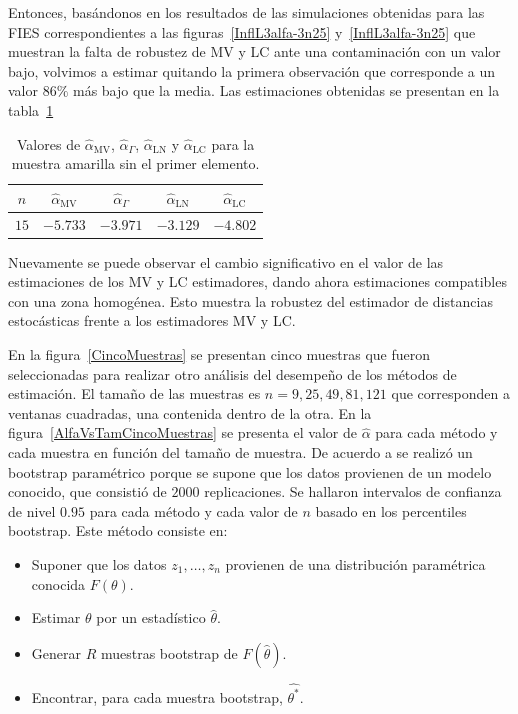 Entonces, basándonos en los resultados de las simulaciones obtenidas para las FIES correspondientes a las figuras~\ref{InflL3alfa-3n25} y~\ref{InflL3alfa-3n25} que muestran la falta de robustez de MV y LC ante una contaminación con un valor bajo, volvimos a estimar quitando la primera observación que corresponde a un valor $86\%$ más bajo que la media. Las estimaciones obtenidas se presentan en la tabla~\ref{SinPrimero}
\begin{table}[htb]
	\centering
	\caption{\label{SinPrimero} Valores de $\widehat{\alpha}_{\text{MV}}$, $\widehat{\alpha}_{\Gamma}$, $\widehat{\alpha}_{\text{LN}}$ y $\widehat{\alpha}_{\text{LC}}$ para la muestra amarilla sin el primer elemento.}
	\begin{tabular}{c*4{c}}
		\toprule
		$n$    &  $\widehat{\alpha}_{\text{MV}}$    &  $\widehat{\alpha}_{\Gamma}$  &  $\widehat{\alpha}_{\text{LN}}$ &  $\widehat{\alpha}_{\text{LC}}$\\
		\midrule
		$15$  & $-5.733$   & $-3.971$    & $-3.129$    & $-4.802$\\
		\bottomrule
	\end{tabular}
\end{table}

Nuevamente se puede observar el cambio significativo en el valor de las estimaciones de los MV y LC estimadores, dando ahora estimaciones compatibles con una zona homogénea. Esto muestra la robustez del estimador de distancias estocásticas frente a los estimadores MV y LC.

En la figura~\ref{CincoMuestras} se presentan cinco muestras que fueron seleccionadas para realizar otro análisis del desempeño de los métodos de estimación. El tamaño de las muestras es $n=9,25,49,81,121$ que corresponden a ventanas cuadradas, una contenida dentro de la otra. En la figura~\ref{AlfaVsTamCincoMuestras} se presenta el valor de $\widehat{\alpha}$ para cada método y cada muestra en función del tamaño de muestra. De acuerdo a \citet{Davison1997} se realizó un bootstrap paramétrico porque se supone que los datos provienen de un modelo conocido, que consistió de $2000$ replicaciones. Se hallaron intervalos de confianza de nivel $0.95$ para cada método y cada valor de $n$ basado en los percentiles bootstrap. Este método consiste en:
\begin{itemize}
	\item Suponer que los datos $z_1,\ldots,z_n$ provienen de una distribución paramétrica conocida $F(\theta)$.
	\item Estimar $\theta$ por un estadístico $\widehat{\theta}$.
	\item Generar $R$ muestras bootstrap de $F(\widehat{\theta})$.
	\item Encontrar, para cada muestra bootstrap, $\widehat{\theta^*}$.
\end{itemize}

